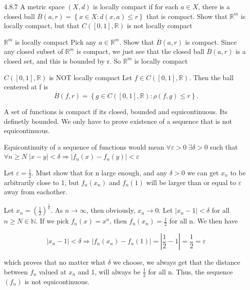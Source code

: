 \documentclass[a4paper,norsk]{article}
\renewcommand{\geq}{\geqslant}
\renewcommand{\leq}{\leqslant}
\renewcommand{\epsilon}{\varepsilon}
\begin{document}
\begin{oppgavebox}{4.8.7}{}
A metric space $ \left( X, d \right)  $ is locally compact if for each $ a \in X $, there is a closed ball $ \overline{B} \left( a, r \right) = \left\{ x \in X : d \left( x, a \right) \leq r \right\}   $ that is compact. Show that $ \mathbb{R}^m $ is locally compact, but that $ C \left( \left[ 0, 1 \right] , \mathbb{R} \right)  $ is not locally compact

\begin{proofbox}{ $ \mathbb{R}^m $ is locally compact }{}
  Pick any $ a \in \mathbb{R}^m $. Show that $ \overline{B} \left( a, r \right)  $ is compact. Since any closed subset of $ \mathbb{R}^m $ is compact, we just see that the closed ball $ \overline{B} \left( a, r \right)  $ is a closed set, and this is bounded by r. So $ \mathbb{R}^m $ is locally compact
\end{proofbox}

\begin{proofbox}{ $ C \left( \left[ 0, 1 \right] , \mathbb{R} \right)  $ is NOT locally compact }{}
  Let $ f \in C \left( \left[ 0, 1 \right] , \mathbb{R} \right)  $. Then the ball centered at f is 
  \[
      \overline{B} \left( f, r \right) = \left\{ g \in C \left( \left[ 0, 1 \right] , \mathbb{R} \right) : \rho \left( f, g \right) \leq r \right\}.
  \]

  A set of functions is compact if its closed, bounded and equicontinuous. Its definetly bounded. We only have to prove existence of a sequence that is not equicontinuous. 


  Equicontinuity of a sequence of functions would mean $\forall \epsilon > 0 \; \exists \delta > 0 $ such that $ \forall n \geq N  \; \left| x - y \right| < \delta \Rightarrow \left| f_n(x) - f_n(y) \right| < \epsilon $ 

  

  

  Let $ \epsilon  = \frac{ 1 }{ 2 } $. Must show that for n large enough, and any $ \delta > 0 $ we can get $ x_n $ to be arbitrarily close to 1, but $ f_n(x_n) $ and $ f_n(1) $ will be larger than or equal to $ \epsilon  $ away from eachother.


  Let $ x_n = \left( \frac{ 1 }{ 2 } \right)^{ \frac{ 1 }{ n }}  $. As $ n \to \infty $, then obviously, $ x_n \to 0 $. Let $ \left| x_n - 1 \right| < \delta $ for all $ n \geq N \in \mathbb{N} $. If we pick $ f_n(x) = x^n $, then $ f_n(x_n) = \frac{ 1 }{ 2 } $  for all n. We then have 

  \[
      \left| x_n - 1 \right| < \delta  \Rightarrow \left| f_n(x_n) - f_n(1) \right| = \left| \frac{ 1 }{ 2 } - 1 \right| = \frac{ 1 }{ 2 } = \epsilon 
  \]

  which proves that no matter what $ \delta  $ we choose, we always get that the distance between $ f_n $  valued at $ x_n $ and 1, will always be $ \frac{ 1 }{ 2 } $ for all n. Thus, the sequence $ \left( f_n \right)  $ is not equicontinuous.
  
\end{proofbox}
\end{oppgavebox}
\end{document}
